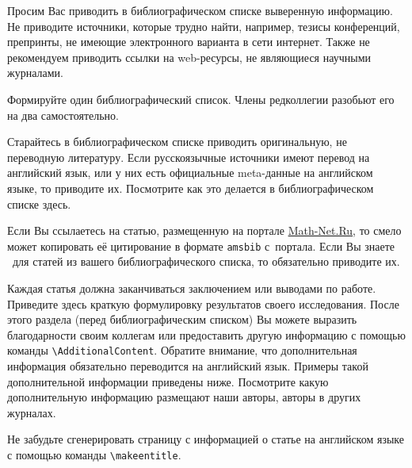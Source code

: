 Просим Вас приводить в библиографическом списке выверенную информацию.
Не приводите источники, которые трудно найти, например, тезисы конференций, препринты, не имеющие электронного варианта в сети интернет.
Также не рекомендуем приводить ссылки на web-ресурсы, не являющиеся научными журналами.

Формируйте один библиографический список.
Члены редколлегии разобьют его на два самостоятельно.


Старайтесь в библиографическом списке приводить оригинальную, не переводную литературу.
Если русскоязычные источники имеют  перевод на английский язык, или у них есть официальные meta-данные на английском языке, то приводите их.
Посмотрите как это делается в библиографическом списке здесь.

Если Вы ссылаетесь на статью, размещенную на портале \href{http://www.mathnet.ru/}{Math-Net.Ru}, то смело может копировать её цитирование в формате  {\tt amsbib} с~портала.
Если Вы знаете \DOIlogo\ для статей из вашего библиографического списка, то обязательно приводите их.


Каждая статья должна заканчиваться заключением или выводами по работе. 
Приведите здесь краткую формулировку результатов своего исследования. 
После этого раздела (перед библиографическим списком) Вы можете выразить благодарности своим коллегам или предоставить другую информацию с помощью команды \verb"\AdditionalContent".
Обратите внимание, что дополнительная информация обязательно переводится на английский язык.
Примеры такой дополнительной информации приведены ниже.
Посмотрите какую дополнительную информацию размещают наши авторы, авторы в других журналах.

Не забудьте сгенерировать страницу с информацией о статье на английском языке с помощью команды \verb"\makeentitle".





